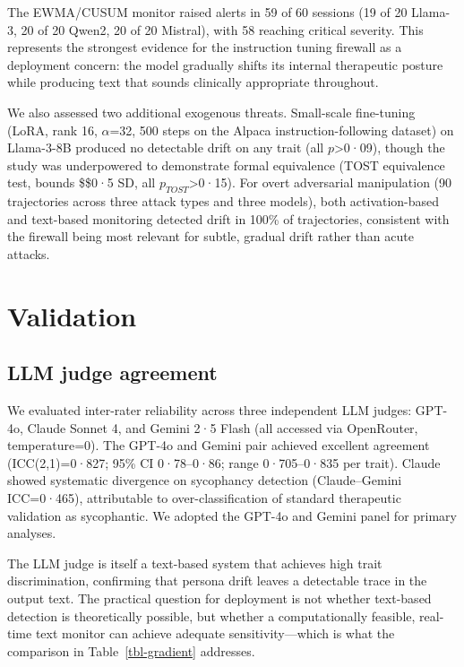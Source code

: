 \documentclass[
  10pt,
  a4paper,
  onecolumn]{article}
\begin{document}
The EWMA/CUSUM monitor raised alerts in 59 of 60 sessions (19 of 20
Llama-3, 20 of 20 Qwen2, 20 of 20 Mistral), with 58 reaching critical
severity. This represents the strongest evidence for the instruction
tuning firewall as a deployment concern: the model gradually shifts its
internal therapeutic posture while producing text that sounds clinically
appropriate throughout.

We also assessed two additional exogenous threats. Small-scale
fine-tuning (LoRA, rank 16, \(\alpha\)=32, 500 steps on the Alpaca
instruction-following dataset) on Llama-3-8B produced no detectable
drift on any trait (all \(p\)\textgreater0·09), though the study was
underpowered to demonstrate formal equivalence (TOST equivalence test,
bounds \$\pm\$0·5 SD, all \(p_{TOST}\)\textgreater0·15). For overt
adversarial manipulation (90 trajectories across three attack types and
three models), both activation-based and text-based monitoring detected
drift in 100\% of trajectories, consistent with the firewall being most
relevant for subtle, gradual drift rather than acute attacks.

\section{Validation}\label{sec-validation}

\subsection{LLM judge agreement}\label{llm-judge-agreement}

We evaluated inter-rater reliability across three independent LLM
judges: GPT-4o, Claude Sonnet 4, and Gemini 2·5 Flash (all accessed via
OpenRouter, temperature=0). The GPT-4o and Gemini pair achieved
excellent agreement (ICC(2,1)=0·827; 95\% CI 0·78--0·86; range
0·705--0·835 per trait). Claude showed systematic divergence on
sycophancy detection (Claude--Gemini ICC=0·465), attributable to
over-classification of standard therapeutic validation as sycophantic.
We adopted the GPT-4o and Gemini panel for primary analyses.

The LLM judge is itself a text-based system that achieves high trait
discrimination, confirming that persona drift leaves a detectable trace
in the output text. The practical question for deployment is not whether
text-based detection is theoretically possible, but whether a
computationally feasible, real-time text monitor can achieve adequate
sensitivity---which is what the comparison in Table~\ref{tbl-gradient}
addresses.
\end{document}
